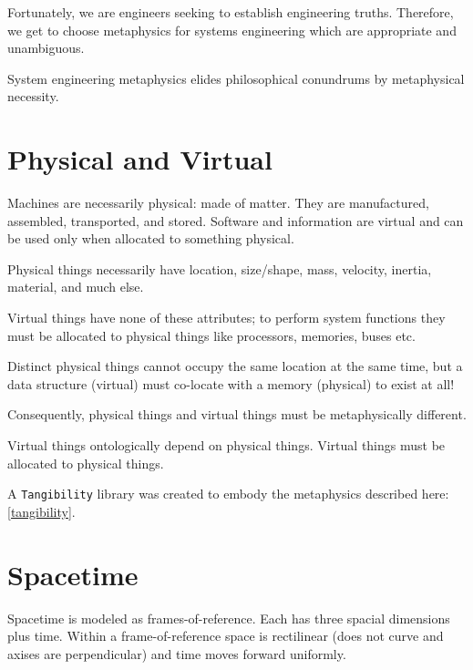 \pn Fortunately, we are engineers seeking to establish engineering truths.  Therefore, we get to choose metaphysics for systems engineering which are appropriate and unambiguous.



System engineering metaphysics elides philosophical conundrums by metaphysical necessity.

\section{Physical and Virtual}\label{sec:phyeph}

\pn Machines are necessarily physical:  made of matter.  They are manufactured, assembled, transported, and stored.  Software and information are virtual and can be used only when allocated to something physical.

\pn Physical things necessarily have location, size/shape, mass, velocity, inertia, material, and much else.

\pn Virtual things have none of these attributes; to perform system functions they must be allocated to physical things like processors, memories, buses etc.

\pn Distinct physical things cannot occupy the same location at the same time, but a data structure (virtual) must co-locate with a memory (physical) to exist at all!

\pn Consequently, physical things and virtual things must be metaphysically different.  

\pn Virtual things ontologically depend on physical things.  Virtual things must be allocated to physical things.

\pn A \texttt{Tangibility} library was created to embody the metaphysics described here: \ref{tangibility}.

\section{Spacetime}\label{sec:spacetime}

\pn Spacetime is modeled as frames-of-reference.  Each  has three spacial dimensions plus time.  Within a frame-of-reference space is rectilinear (does not curve and axises are perpendicular) and time moves forward uniformly.  

